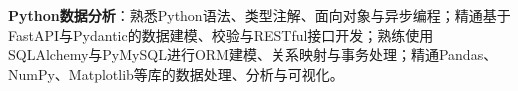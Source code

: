 \item \textbf{Python数据分析}：熟悉Python语法、类型注解、面向对象与异步编程；精通基于FastAPI与Pydantic的数据建模、校验与RESTful接口开发；熟练使用SQLAlchemy与PyMySQL进行ORM建模、关系映射与事务处理；精通Pandas、NumPy、Matplotlib等库的数据处理、分析与可视化。